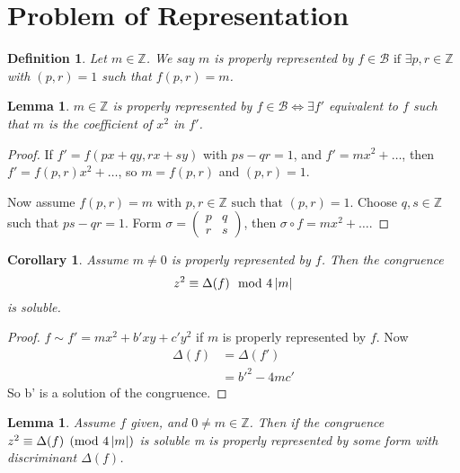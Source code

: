 \documentclass{notes}
\theoremstyle{plain}
\newtheorem{corollary}[theorem]{Corollary}
\newtheorem{definition}[theorem]{Definition}
\newtheorem{lemma}[theorem]{Lemma}
\begin{document}
\section{Problem of Representation}

\begin{definition}
  Let $m \in \mathbb{Z}$.  We say $m$ is properly represented by $f
  \in \mathcal{B} \text{ if } \exists p,r \in \mathbb{Z}$ with
  $(p,r)=1$ such that $f(p,r)=m$.
\end{definition}

\begin{lemma}
  $m \in \mathbb{Z}$ is properly represented by $f \in \mathcal{B}
  \Leftrightarrow \exists f'$ equivalent to $f$ such that $m$ is the
  coefficient of $x^2$ in $f'$.
\end{lemma}

\begin{proof}
  If $f' = f(px+qy,rx+sy)$ with $ps-qr=1$, and $f' = mx^2 + \dots$,
  then $f' = f(p,r)x^2 + \dots$, so $m = f(p,r)$ and $(p,r)=1$.
  
  Now assume $f(p,r)=m$ with $p,r \in \mathbb{Z} \text{ such that }
  (p,r)=1$.  Choose $q,s \in \mathbb{Z}$ such that $ps-qr = 1$.  Form
  $\sigma = \left(
\begin{smallmatrix}
  p       & q \\
  r & s
\end{smallmatrix}\right)$, then $\sigma \circ f = mx^2 + \dots$. 
\end{proof}

\begin{corollary}
  Assume $m \ne 0$ is properly represented by $f$.  Then the
  congruence
\[
z^2 \equiv \Delta(f) \mod{4\left|m\right|}
\]
is soluble.
\end{corollary}

\begin{proof}
  $f \sim f' = mx^2+b'xy+c'y^2$ if $m$ is properly represented by $f$.
  Now
\begin{align*}
  \Delta(f) &= \Delta(f') \\
  &= {b'}^2 - 4mc'
\end{align*}
So b' is a solution of the congruence.
\end{proof}

\begin{lemma}
  Assume $f$ given, and $0 \ne m \in \mathbb{Z}$.  Then if the
  congruence $z^2 \equiv \Delta(f) \pmod{4\left|m\right|}$ is soluble m is
  properly represented by some form with discriminant $\Delta(f)$.
\end{lemma}
\end{document}
